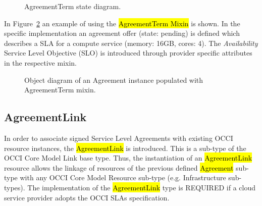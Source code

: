 \documentclass[10pt,a4paper]{article}
\begin{document}
\begin{figure}[!h]
	{\centering {} \par}
	\caption{AgreementTerm state diagram.}
	\label{fig:terms-states}
\end{figure}

In Figure~\ref{fig:terms-example} an example of using the \hl{AgreementTerm Mixin} is shown. In the specific implementation an agreement offer (state: pending) is defined which describes a SLA for a compute service (memory: 16GB, cores: 4). The \textit{Availability} Service Level Objective (SLO) is introduced through provider specific attributes in the respective mixin.

\begin{figure}[!h]
	{\centering {} \par}
	\caption{Object diagram of an Agreement instance populated with AgreementTerm mixin.}
	\label{fig:terms-example}
\end{figure}


\subsection{AgreementLink}
In order to associate signed Service Level Agreements with existing OCCI resource instances, the \hl{AgreementLink} is introduced. This is a sub-type of the OCCI Core Model Link base type. Thus, the instantiation of an \hl{AgreementLink} resource allows the linkage of resources of the previous defined \hl{Agreement} sub-type with any OCCI Core Model Resource sub-type (e.g. Infrastructure sub-types). The implementation of the \hl{AgreementLink} type is REQUIRED if a cloud service provider adopts the OCCI SLAs specification. 
\end{document}
